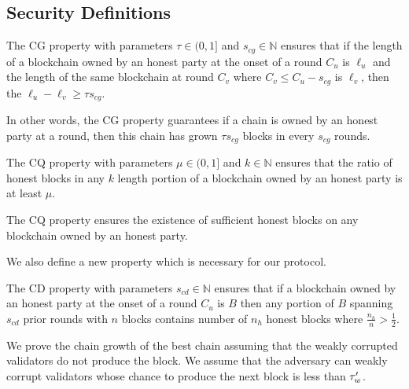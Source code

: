
\subsection{Security Definitions}

\begin{definition} \label{def:cg}
	The CG  property with parameters $ \tau \in (0,1] $ and $ s_{cg}\in \mathbb{N} $ ensures that if the length of a blockchain owned by an honest party at the onset of a round $ C_u $ is $ \ell_u $ and the length of the same blockchain at round $ C_v  $ where $ C_v \leq C_u - s_{cg}  $ is $\ell_v$, then the $ \ell_u  - \ell_v \geq  \tau s_{cg} $.
\end{definition}

In other words, the CG property guarantees if a chain is owned by an honest party at a round, then this chain has grown $ \tau s_{cg}$ blocks in every $ s_{cg} $ rounds. 

\begin{definition}\label{def:cq}
	The CQ property with parameters $ \mu \in (0,1]  $ and $ k \in \mathbb{N} $ ensures that the ratio of honest blocks in any $ k $ length portion of a blockchain owned by an honest party is at least $ \mu $.
\end{definition} 

The CQ property ensures the existence of sufficient honest blocks on  any blockchain owned by an honest party.

We also define a new property which is necessary for our protocol.
\begin{definition}
	\label{def:cd}
	The CD property with parameters $s_{cd} \in \mathbb{N}$ ensures that  if a blockchain owned by an honest party at the onset of a round $ C_u $ is $ B $ then any portion of  $B$ spanning $s_{cd}$ prior rounds with $n$ blocks  contains  number of $n_h$ honest blocks  where $\frac{n_h}{n}> \frac{1}{2}$.
\end{definition}


We prove the chain growth of the best chain assuming that the weakly corrupted validators do not produce the block. We assume that the adversary can weakly corrupt validators whose chance to produce the next block is less than $ \tau_w' $.



